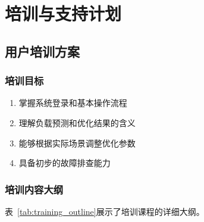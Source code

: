 \chapter{培训与支持计划}

\section{用户培训方案}

\subsection{培训目标}
\begin{enumerate}
    \item 掌握系统登录和基本操作流程
    \item 理解负载预测和优化结果的含义
    \item 能够根据实际场景调整优化参数
    \item 具备初步的故障排查能力
\end{enumerate}

\subsection{培训内容大纲}

表~\ref{tab:training_outline}展示了培训课程的详细大纲。

